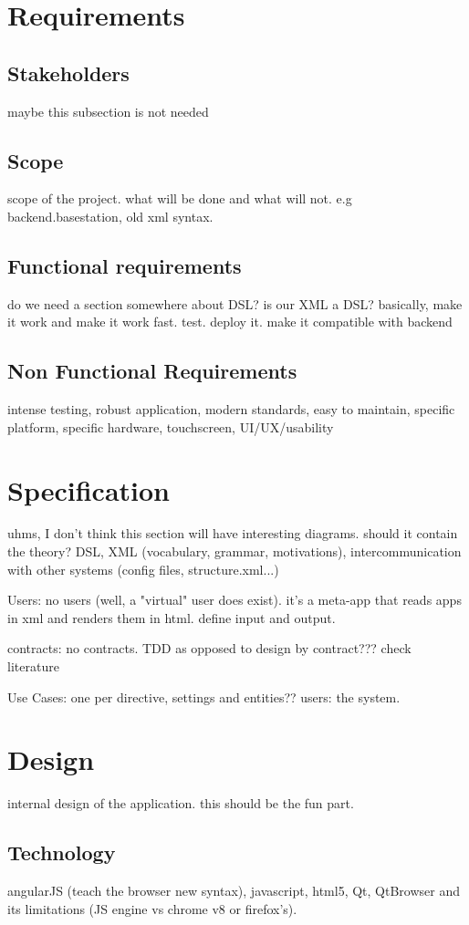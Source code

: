 \chapter{Requirements}
\section{Stakeholders}
maybe this subsection is not needed
\section{Scope}
scope of the project. what will be done and what will not. e.g backend.basestation, old xml syntax.

\section{Functional requirements}
do we need a section somewhere about DSL? is our XML a DSL?
basically, make it work and make it work fast. test. deploy it. make it compatible with backend

\section{Non Functional Requirements}
intense testing, robust application, modern standards, easy to maintain, specific platform, specific hardware, touchscreen, UI/UX/usability 

\chapter{Specification}
uhms, I don't think this section will have interesting diagrams.
should it contain the theory? DSL, XML (vocabulary, grammar, motivations), intercommunication with other systems (config files, structure.xml...)

Users: no users (well, a "virtual" user does exist). it's a meta-app that reads apps in xml and renders them in html. define input and output.

contracts: no contracts. TDD as opposed to design by contract??? check literature

Use Cases: one per directive, settings and entities?? users: the system.

\chapter{Design}
internal design of the application. this should be the fun part.
\section{Technology}
angularJS (teach the browser new syntax), javascript, html5, Qt, QtBrowser and its limitations (JS engine vs chrome v8 or firefox's).

